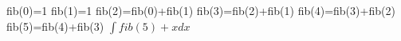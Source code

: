 \documentclass[11pt]{article}
\begin{document}
    \delayed fib(0)=1
    \delayed fib(1)=1
    \delayed fib(2)=fib(0)+fib(1)
    \delayed fib(3)=fib(2)+fib(1)
    \delayed fib(4)=fib(3)+fib(2)
    \delayed fib(5)=fib(4)+fib(3)
    $\int fib(5)+x dx$
\end{document}
